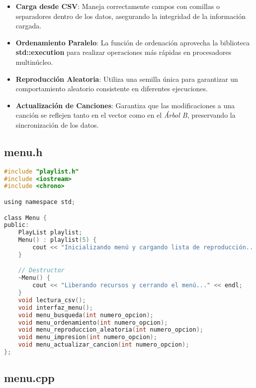 \documentclass[12pt]{article}
\begin{document}
\begin{flushleft}
\begin{itemize}[left=4em]
                    \item \textbf{Carga desde CSV}: Maneja correctamente campos con comillas o separadores dentro de los datos, asegurando la integridad de la información cargada.
                    
                    \item \textbf{Ordenamiento Paralelo}: La función de ordenación aprovecha la biblioteca \textbf{std::execution} para realizar operaciones más rápidas en procesadores multinúcleo.
                    
                    \item \textbf{Reproducción Aleatoria}: Utiliza una semilla única para garantizar un comportamiento aleatorio consistente en diferentes ejecuciones.
                    
                    \item \textbf{Actualización de Canciones}: Garantiza que las modificaciones a una canción se reflejen tanto en el vector como en el \textit{Árbol B}, preservando la sincronización de los datos.
                \end{itemize}
            
    
                
                
            \subsection{menu.h}
            
            \begin{lstlisting}[language=C, style=mystyle, caption={Cabecera de la Clae Menú}]
#include "playlist.h"
#include <iostream>
#include <chrono>

using namespace std;

class Menu {
public:
    PlayList playlist;
    Menu() : playlist(5) {
        cout << "Inicializando menú y cargando lista de reproducción..." << endl;
    }

    // Destructor
    ~Menu() {
        cout << "Liberando recursos y cerrando el menú..." << endl;
    }
    void lectura_csv();
    void interfaz_menu();
    void menu_busqueda(int numero_opcion);
    void menu_ordenamiento(int numero_opcion);
    void menu_reproduccion_aleatoria(int numero_opcion);
    void menu_impresion(int numero_opcion);
    void menu_actualizar_cancion(int numero_opcion);
};   
            \end{lstlisting}

            \subsection{menu.cpp}
            

\end{flushleft}
\end{document}
